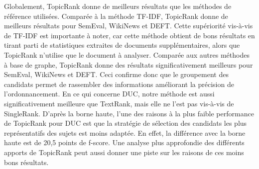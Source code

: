     Globalement, TopicRank donne de meilleurs résultats que les méthodes de
    référence utilisées.
    Comparée à la méthode TF-IDF, TopicRank donne de meilleurs résultats pour
    SemEval, WikiNews et DEFT. Cette supériorité vis-à-vis de TF-IDF est
    importante à noter, car cette méthode obtient de bons résultats en tirant
    parti de statistiques extraites de documents supplémentaires, alors que TopicRank n'utilise que le document à analyser.
    Comparée aux autres méthodes à base de graphe, TopicRank donne des
    résultats significativement meilleurs pour SemEval, WikiNews et DEFT. Ceci
    confirme donc que le groupement des candidats permet de rassembler des
    informations améliorant la précision de l'ordonnancement. En ce qui concerne
    DUC, notre méthode est aussi significativement meilleure que TextRank,
    mais elle ne l'est pas vis-à-vis de SingleRank. D'après la borne haute,
    l'une des raisons à la plus faible performance de TopicRank pour DUC est que
    la stratégie de sélection des candidats les plus représentatifs des sujets
    est moins adaptée. En effet, la différence avec la borne haute est de 20,5
    points de f-score. Une analyse plus approfondie des différents apports de
    TopicRank peut aussi donner une piste sur les raisons de ces moins bons
    résultats.
